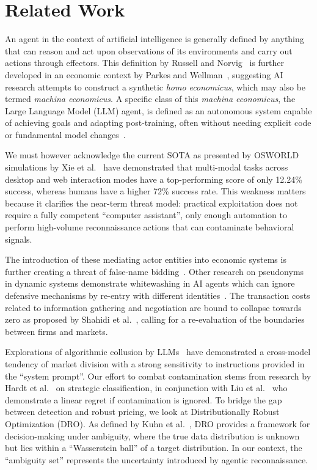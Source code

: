\documentclass[sigconf]{acmart}
\begin{document}
\section{Related Work}

An agent in the context of artificial intelligence is generally defined by anything that can reason and act upon observations of its environments and carry out actions through effectors. This definition by Russell and Norvig~\cite{russell_artificial_2021} is further developed in an economic context by Parkes and Wellman~\cite{parkes_economic_2015}, suggesting AI research attempts to construct a synthetic \textit{homo economicus}, which may also be termed \textit{machina economicus}. A specific class of this \textit{machina economicus}, the Large Language Model (LLM) agent, is defined as an autonomous system capable of achieving goals and adapting post-training, often without needing explicit code or fundamental model changes~\cite{xia_evaluation-driven_2025}.

We must however acknowledge the current SOTA as presented by OSWORLD simulations by Xie et al.~\cite{xie_osworld_2024} have demonstrated that multi-modal tasks across desktop and web interaction modes have a top-performing score of only 12.24\% success, whereas humans have a higher 72\% success rate. This weakness matters because it clarifies the near-term threat model: practical exploitation does not require a fully competent ``computer assistant'', only enough automation to perform high-volume reconnaissance actions that can contaminate behavioral signals.

The introduction of these mediating actor entities into economic systems is further creating a threat of false-name bidding~\cite{yokoo_effect_2004}. Other research on pseudonyms in dynamic systems demonstrate whitewashing in AI agents which can ignore defensive mechanisms by re-entry with different identities~\cite{feldman_free-riding_2004}. The transaction costs related to information gathering and negotiation are bound to collapse towards zero as proposed by Shahidi et al.~\cite{shahidi_coasean_2025}, calling for a re-evaluation of the boundaries between firms and markets.

Explorations of algorithmic collusion by LLMs~\cite{fish_algorithmic_2025} have demonstrated a cross-model tendency of market division with a strong sensitivity to instructions provided in the ``system prompt''. Our effort to combat contamination stems from research by Hardt et al.~\cite{hardt_strategic_2015} on strategic classification, in conjunction with Liu et al.~\cite{liu_contextual_2024} who demonstrate a linear regret if contamination is ignored. To bridge the gap between detection and robust pricing, we look at Distributionally Robust Optimization (DRO). As defined by Kuhn et al.~\cite{kuhn_wasserstein_2024}, DRO provides a framework for decision-making under ambiguity, where the true data distribution is unknown but lies within a ``Wasserstein ball'' of a target distribution. In our context, the ``ambiguity set'' represents the uncertainty introduced by agentic reconnaissance.
\end{document}
